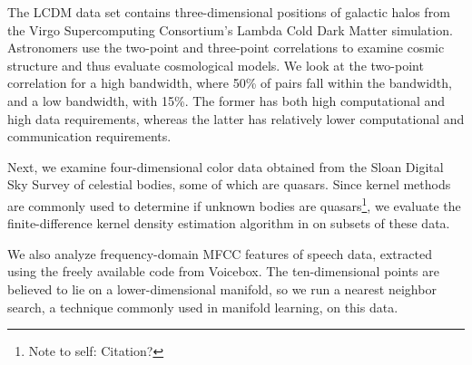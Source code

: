 \documentclass[twoside,leqno,twocolumn]{article}
\newcommand{\authornote}[1]{\footnote{Note to self: #1}}
\newcommand{\authorsnote}[1]{\authornote{#1}}
\begin{document}
The LCDM data set contains three-dimensional positions of galactic halos from the Virgo Supercomputing Consortium's Lambda Cold Dark Matter simulation.
Astronomers use the two-point and three-point correlations to examine cosmic structure and thus evaluate cosmological models.
We look at the two-point correlation for a high bandwidth, where 50\% of pairs fall within the bandwidth, and a low bandwidth, with 15\%.
The former has both high computational and high data requirements, whereas the latter has relatively lower computational and communication requirements.

Next, we examine four-dimensional color data obtained from the Sloan Digital Sky Survey of celestial bodies, some of which are quasars.
Since kernel methods are commonly used to determine if unknown bodies are quasars\authorsnote{Citation?}, we evaluate the finite-difference kernel density estimation algorithm in \cite{gray_kde} on subsets of these data.

We also analyze frequency-domain MFCC features of speech data, extracted using the freely available code from Voicebox.
The ten-dimensional points are believed to lie on a lower-dimensional manifold, so we run a nearest neighbor search, a technique commonly used in manifold learning, on this data.


\end{document}
